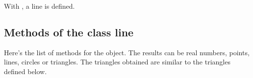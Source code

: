 With  , a line is defined.


\begin{tkzexample}[latex=7cm]
\begin{center}
\end{center}
\end{tkzexample}


\newpage
\subsection{Methods of the class line} %
\label{sub:methods_from_class_line}
Here's the list of methods for the  object. The results can be real numbers, points, lines, circles or triangles. The triangles obtained are similar to the triangles defined below.

